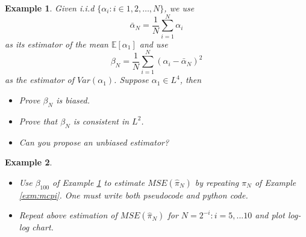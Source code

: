 \documentclass{article}
\newtheorem{example}{Example}
\begin{document}
\begin{example} \label{exm:mse}
 Given i.i.d $\{\alpha_i: i\in 1, 2, \ldots, N\}$, we use 
$$\bar \alpha_N = \frac 1 N \sum_{i=1}^N \alpha_i$$
as its estimator of the mean $\mathbb E[\alpha_1]$ 
and use
$$\beta_N = \frac 1 N \sum_{i=1}^N (\alpha_i -\bar \alpha_N)^2$$
as the estimator of $Var(\alpha_1)$. Suppose $\alpha_1\in L^4$, then 
\begin{itemize}
 \item Prove $\beta_N$ is biased.
 \item Prove that $\beta_N$ is consistent in $L^2$.
 \item Can you propose an unbiased estimator?
 \end{itemize}
\end{example}
\begin{example}
\begin{itemize}
 \item Use $\beta_{100}$ of Example \ref{exm:mse} to estimate 
 $MSE(\hat \pi_{N})$ by repeating $\pi_{N}$ of Example \ref{exm:mcpi}. One must write both pseudocode and python code.
 \item Repeat above estimation of $MSE(\hat \pi_{N})$ for $N= 2^{-i}: i = 5, ...10$ and plot log-log chart.
\end{itemize}
 
\end{example}
\end{document}
